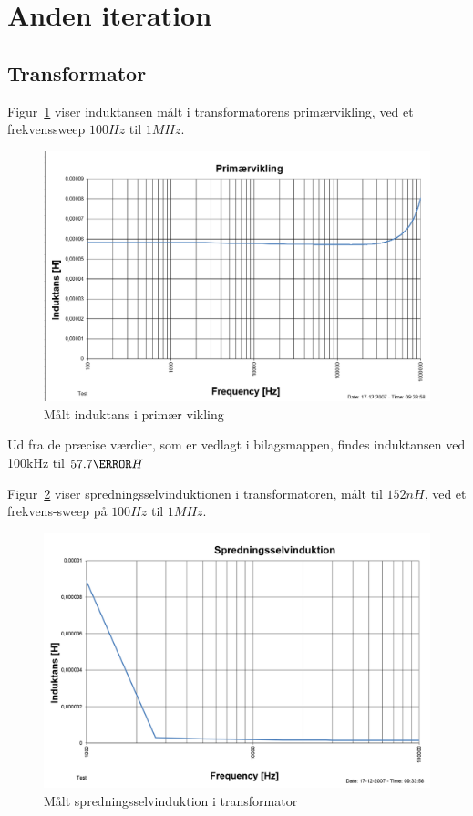 \section{Anden iteration}

\subsection{Transformator}
Figur~\ref{fig: Primarinduktans} viser induktansen målt i transformatorens primærvikling, ved et frekvenssweep $100Hz$ til $1MHz$. 
\begin{figure}[H]
	\center
	\includegraphics[max width=0.7\linewidth]{../dokumentation/tex/2iteration/billeder/Primarinduktans.png}
	\caption{Målt induktans i primær vikling}
	\label{fig: Primarinduktans}
\end{figure}
\noindent Ud fra de præcise værdier, som er vedlagt i bilagsmappen, findes induktansen ved 100kHz til $57.7\micro H$

Figur~\ref{fig: leakageinductance} viser spredningsselvinduktionen i transformatoren, målt til $152nH$, ved et frekvens-sweep på $100Hz$ til $1MHz$.
\begin{figure}[H]
	\center
	\includegraphics[max width=0.7\linewidth]{../dokumentation/tex/2iteration/billeder/Spredningsselvinduktion.png}
	\caption{Målt spredningsselvinduktion i transformator}
	\label{fig: leakageinductance}
\end{figure}


